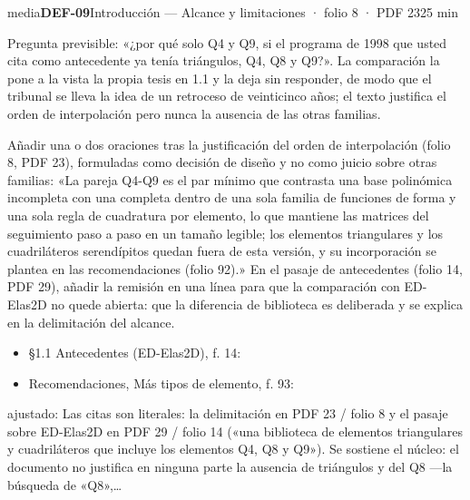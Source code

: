 \begin{ficha}{media}{\casilla\textbf{DEF-09}\quad{}\quad Introducción — Alcance y limitaciones · folio 8 · PDF 23\hfill 25 min}
\par
{}Pregunta previsible: «¿por qué solo Q4 y Q9, si el programa de 1998 que usted cita como antecedente ya tenía triángulos, Q4, Q8 y Q9?». La comparación la pone a la vista la propia tesis en 1.1 y la deja sin responder, de modo que el tribunal se lleva la idea de un retroceso de veinticinco años; el texto justifica el orden de interpolación pero nunca la ausencia de las otras familias.\par
{}Añadir una o dos oraciones tras la justificación del orden de interpolación (folio 8, PDF 23), formuladas como decisión de diseño y no como juicio sobre otras familias: «La pareja Q4-Q9 es el par mínimo que contrasta una base polinómica incompleta con una completa dentro de una sola familia de funciones de forma y una sola regla de cuadratura por elemento, lo que mantiene las matrices del seguimiento paso a paso en un tamaño legible; los elementos triangulares y los cuadriláteros serendípitos quedan fuera de esta versión, y su incorporación se plantea en las recomendaciones (folio 92).» En el pasaje de antecedentes (folio 14, PDF 29), añadir la remisión en una línea para que la comparación con ED-Elas2D no quede abierta: que la diferencia de biblioteca es deliberada y se explica en la delimitación del alcance.\par
{}\begin{itemize}[leftmargin=1.2em,itemsep=1pt,topsep=1pt]
\item {\small §1.1 Antecedentes (ED-Elas2D), f. 14: }
\item {\small Recomendaciones, Más tipos de elemento, f. 93: }
\end{itemize}
{\footnotesize\color{gris}ajustado: Las citas son literales: la delimitación en PDF 23 /\allowbreak{} folio 8 y el pasaje sobre ED-Elas2D en PDF 29 /\allowbreak{} folio 14 («una biblioteca de elementos triangulares y cuadriláteros que incluye los elementos Q4, Q8 y Q9»). Se sostiene el núcleo: el documento no justifica en ninguna parte la ausencia de triángulos y del Q8 —la búsqueda de «Q8»,…\par}
\end{ficha}
